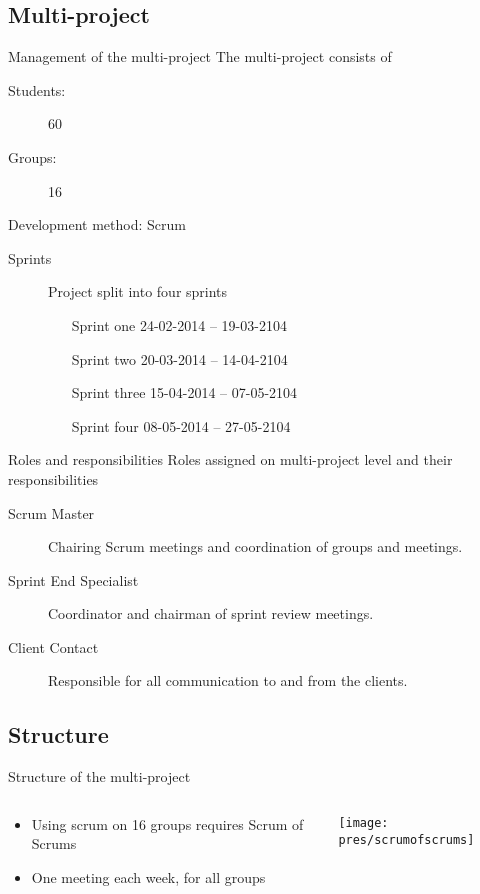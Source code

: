 \subsection{Multi-project}
\begin{frame}{Management of the multi-project}
	The multi-project consists of
	\begin{description}
		\item[Students:]{60}
		\item[Groups:]{16}
	\end{description}

	Development method: Scrum
	\begin{description}
		\item[Sprints]{Project split into four sprints}
		\begin{itemize}
			\item[Sprint one] 24-02-2014 -- 19-03-2104 
			\item[Sprint two] 20-03-2014 -- 14-04-2104
			\item[Sprint three] 15-04-2014 -- 07-05-2104
			\item[Sprint four] 08-05-2014 -- 27-05-2104
		\end{itemize}
	\end{description}
\end{frame}

\begin{frame}{Roles and responsibilities}
	Roles assigned on multi-project level and their responsibilities
	\begin{description}
		\item[Scrum Master] Chairing Scrum meetings and coordination of groups and meetings.
		\item[Sprint End Specialist] Coordinator and chairman of sprint review meetings.
		\item[Client Contact] Responsible for all communication to and from the clients.
	\end{description}
\end{frame}

\subsection{Structure}
\begin{frame}{Structure of the multi-project}
\begin{columns}
\begin{column}{.38\textwidth}
\begin{itemize}
\item Using scrum on 16 groups requires Scrum of Scrums
\item One meeting each week, for all groups
\end{itemize}
\end{column}
\begin{column}{.58\textwidth}
\texttt{[image: pres/scrumofscrums]}
\end{column}
\end{columns}
\end{frame}

